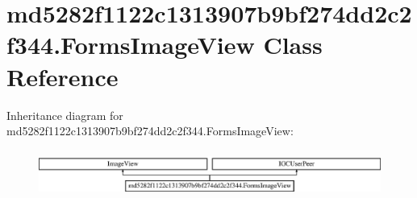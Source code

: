 \hypertarget{classmd5282f1122c1313907b9bf274dd2c2f344_1_1FormsImageView}{}\section{md5282f1122c1313907b9bf274dd2c2f344.\+Forms\+Image\+View Class Reference}
\label{classmd5282f1122c1313907b9bf274dd2c2f344_1_1FormsImageView}
Inheritance diagram for md5282f1122c1313907b9bf274dd2c2f344.\+Forms\+Image\+View\+:\begin{figure}[H]
\begin{center}
\leavevmode
\includegraphics[height=1.564246cm]{classmd5282f1122c1313907b9bf274dd2c2f344_1_1FormsImageView}
\end{center}
\end{figure}
